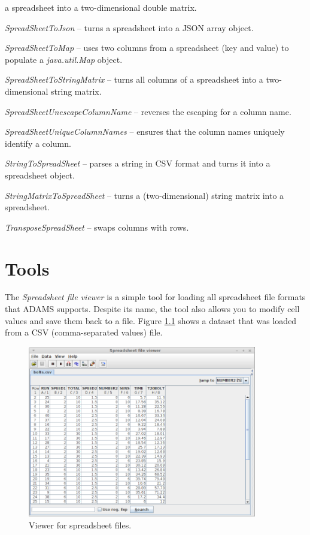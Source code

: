\documentclass[a4paper]{book}
\begin{document}
\begin{tight_itemize}
	a spreadsheet into a two-dimensional double matrix.
	\item \textit{SpreadSheetToJson} -- turns a spreadsheet into a JSON array object.
	\item \textit{SpreadSheetToMap} -- uses two columns from a spreadsheet
	(key and value) to populate a \textit{java.util.Map} object.
	\item \textit{SpreadSheetToStringMatrix} -- turns all columns of
	a spreadsheet into a two-dimensional string matrix.
	\item \textit{SpreadSheetUnescapeColumnName} -- reverses the escaping for
	a column name.
	\item \textit{SpreadSheetUniqueColumnNames} -- ensures that the column
	names uniquely identify a column.
	\item \textit{StringToSpreadSheet} -- parses a string in CSV format and
	turns it into a spreadsheet object.
	\item \textit{StringMatrixToSpreadSheet} -- turns a (two-dimensional) 
	string matrix into a spreadsheet.
	\item \textit{TransposeSpreadSheet} -- swaps columns with rows.
\end{tight_itemize}

\chapter{Tools}
The \textit{Spreadsheet file viewer} is a simple tool for loading all spreadsheet
file formats that ADAMS supports. Despite its name, the tool also allows you to
modify cell values and save them back to a file. Figure \ref{spreadsheet-viewer} shows a
dataset that was loaded from a CSV (comma-separated values) file.

\begin{figure}[htb]
  \centering
  \includegraphics[width=10.0cm]{images/spreadsheet-viewer.png}
  \caption{Viewer for spreadsheet files.}
  \label{spreadsheet-viewer}
\end{figure}
\end{document}
